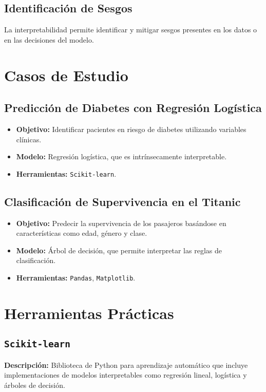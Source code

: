 \begin{refsection}
\subsection{Identificación de Sesgos}
La interpretabilidad permite identificar y mitigar sesgos presentes en los datos o en las decisiones del modelo.

\section{Casos de Estudio}
\subsection{Predicción de Diabetes con Regresión Logística}
\begin{itemize}
    \item \textbf{Objetivo:} Identificar pacientes en riesgo de diabetes utilizando variables clínicas.
    \item \textbf{Modelo:} Regresión logística, que es intrínsecamente interpretable.
    \item \textbf{Herramientas:} \texttt{Scikit-learn}.
\end{itemize}

\subsection{Clasificación de Supervivencia en el Titanic}
\begin{itemize}
    \item \textbf{Objetivo:} Predecir la supervivencia de los pasajeros basándose en características como edad, género y clase.
    \item \textbf{Modelo:} Árbol de decisión, que permite interpretar las reglas de clasificación.
    \item \textbf{Herramientas:} \texttt{Pandas}, \texttt{Matplotlib}.
\end{itemize}

\section{Herramientas Prácticas}
\subsection{\texttt{Scikit-learn}}
\textbf{Descripción:} Biblioteca de Python para aprendizaje automático que incluye implementaciones de modelos interpretables como regresión lineal, logística y árboles de decisión.


\end{refsection}
